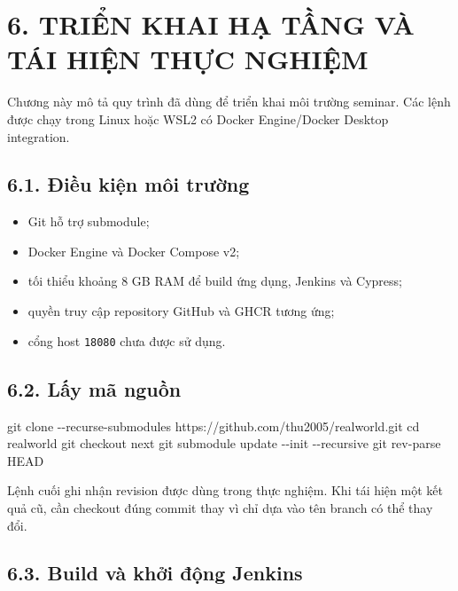\documentclass[
  vietnamese,
  12pt,
  a4paper,
  oneside]{report}
\newenvironment{Shaded}{}{}
\newcommand{\AttributeTok}[1]{\textcolor[rgb]{0.49,0.56,0.16}{#1}}
\newcommand{\BuiltInTok}[1]{\textcolor[rgb]{0.00,0.50,0.00}{#1}}
\newcommand{\FunctionTok}[1]{\textcolor[rgb]{0.02,0.16,0.49}{#1}}
\newcommand{\NormalTok}[1]{#1}
\providecommand{\tightlist}{%
  \setlength{\itemsep}{0pt}\setlength{\parskip}{0pt}}
\begin{document}
\chapter{6. TRIỂN KHAI HẠ TẦNG VÀ TÁI HIỆN THỰC
NGHIỆM}\label{6-triux1ec3n-khai-hux1ea1-tux1ea7ng-vuxe0-tuxe1i-hiux1ec7n-thux1ef1c-nghiux1ec7m}

Chương này mô tả quy trình đã dùng để triển khai môi trường seminar. Các
lệnh được chạy trong Linux hoặc WSL2 có Docker Engine/Docker Desktop
integration.

\section{6.1. Điều kiện môi
trường}\label{61-ux111iux1ec1u-kiux1ec7n-muxf4i-trux1b0ux1eddng}

\begin{itemize}
\tightlist
\item
  Git hỗ trợ submodule;
\item
  Docker Engine và Docker Compose v2;
\item
  tối thiểu khoảng 8 GB RAM để build ứng dụng, Jenkins và Cypress;
\item
  quyền truy cập repository GitHub và GHCR tương ứng;
\item
  cổng host \texttt{18080} chưa được sử dụng.
\end{itemize}

\section{6.2. Lấy mã nguồn}\label{62-lux1ea5y-muxe3-nguux1ed3n}

\begin{Shaded}
\begin{Highlighting}[]
\FunctionTok{git}\NormalTok{ clone }\AttributeTok{{-}{-}recurse{-}submodules}\NormalTok{ https://github.com/thu2005/realworld.git}
\BuiltInTok{cd}\NormalTok{ realworld}
\FunctionTok{git}\NormalTok{ checkout next}
\FunctionTok{git}\NormalTok{ submodule update }\AttributeTok{{-}{-}init} \AttributeTok{{-}{-}recursive}
\FunctionTok{git}\NormalTok{ rev{-}parse HEAD}
\end{Highlighting}
\end{Shaded}

Lệnh cuối ghi nhận revision được dùng trong thực nghiệm. Khi tái hiện
một kết quả cũ, cần checkout đúng commit thay vì chỉ dựa vào tên branch
có thể thay đổi.

\section{6.3. Build và khởi động
Jenkins}\label{63-build-vuxe0-khux1edfi-ux111ux1ed9ng-jenkins}
\end{document}
